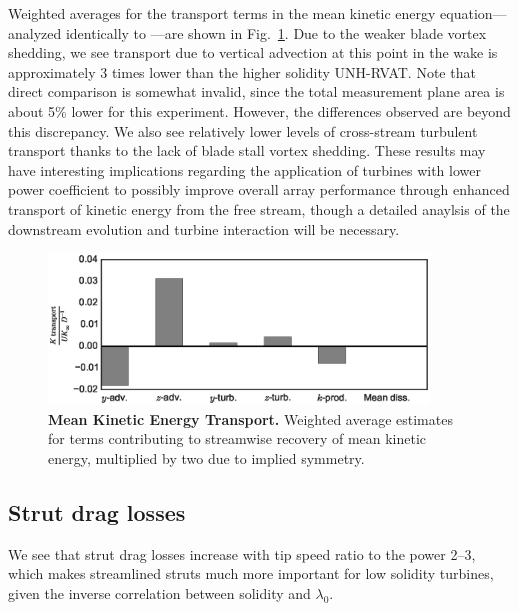 \documentclass[10pt,letterpaper]{article}
\begin{document}
Weighted averages for the transport terms in the mean kinetic energy
equation---analyzed identically to \cite{Bachant2015-JoT}---are shown in
Fig.~\ref{fig:Ktransport}. Due to the weaker blade vortex shedding, we see
transport due to vertical advection at this point in the wake is approximately 3
times lower than the higher solidity UNH-RVAT. Note that direct comparison is
somewhat invalid, since the total measurement plane area is about 5\% lower for
this experiment. However, the differences observed are beyond this discrepancy.
We also see relatively lower levels of cross-stream turbulent transport thanks
to the lack of blade stall vortex shedding. These results may have interesting
implications regarding the application of turbines with lower power coefficient
to possibly improve overall array performance through enhanced transport of
kinetic energy from the free stream, though a detailed anaylsis of the
downstream evolution and turbine interaction will be necessary.

\begin{figure}[ht!]
    \includegraphics[width=0.9\textwidth]{figures/K_trans_bar_graph.eps}

    \caption{{\bf Mean Kinetic Energy Transport.} Weighted average estimates for
    terms contributing to streamwise recovery of mean kinetic energy, multiplied
    by two due to implied symmetry.}

    \label{fig:Ktransport}
\end{figure}


\subsection*{Strut drag losses}

We see that strut drag losses increase with tip speed ratio to the power 2--3,
which makes streamlined struts much more important for low solidity turbines,
given the inverse correlation between solidity and $\lambda_0$.
\end{document}
